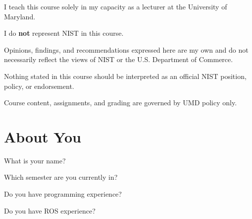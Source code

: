 \documentclass[
    10pt,
    dvipsnames,
    svgnames,
    x11names,
    aspectratio=1610,
    english,
    codeminted]{beamer}
\begin{document}
\endgroup
\begingroup
{}
\begin{frame}

\medskip
\begin{MyBox}
\large
 I teach this course solely in my capacity as a lecturer at the University of Maryland.
\bigskip
 \begin{compactitem}
    \item I do \textbf{not} represent NIST in this course.
    \item Opinions, findings, and recommendations expressed here are my own and do not necessarily reflect the views of NIST or the U.S. Department of Commerce.
    \item Nothing stated in this course should be interpreted as an official NIST position, policy, or endorsement.
    \item Course content, assignments, and grading are governed by UMD policy only.
\end{compactitem}
\end{MyBox}

\end{frame}
\endgroup
\section*{About You}
\begingroup
{}
\begin{frame}
  \secdivheader{\secname}
  

\begin{compactitem}
        \item What is your name?
        \item Which semester are you currently in?
        \item Do you have programming experience?
        \item Do you have ROS experience?
    \end{compactitem}

\end{frame}
\endgroup

\end{document}
